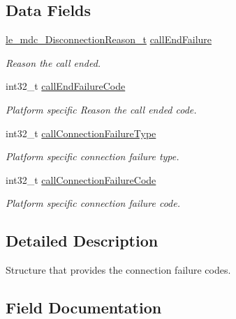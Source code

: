 \subsection*{Data Fields}
\begin{DoxyCompactItemize}
\item 
\hyperlink{le__mdc__interface_8h_ad1fe8909ae01a2f7e33fdbdc6938bf17}{le\+\_\+mdc\+\_\+\+Disconnection\+Reason\+\_\+t} \hyperlink{structpa__mdc___connection_failure_code__t_aa164be5787276d26a94f031c43b2ccf6}{call\+End\+Failure}
\begin{DoxyCompactList}\small\item\em Reason the call ended. \end{DoxyCompactList}\item 
int32\+\_\+t \hyperlink{structpa__mdc___connection_failure_code__t_a751d08e6d71ad00e7b5704e7cfad3309}{call\+End\+Failure\+Code}
\begin{DoxyCompactList}\small\item\em Platform specific Reason the call ended code. \end{DoxyCompactList}\item 
int32\+\_\+t \hyperlink{structpa__mdc___connection_failure_code__t_a9212bcc5698b48e5c10b1964103ee651}{call\+Connection\+Failure\+Type}
\begin{DoxyCompactList}\small\item\em Platform specific connection failure type. \end{DoxyCompactList}\item 
int32\+\_\+t \hyperlink{structpa__mdc___connection_failure_code__t_a26feea2c0f3e60648a6f79c2b5f6c83d}{call\+Connection\+Failure\+Code}
\begin{DoxyCompactList}\small\item\em Platform specific connection failure code. \end{DoxyCompactList}\end{DoxyCompactItemize}


\subsection{Detailed Description}
Structure that provides the connection failure codes. 

\subsection{Field Documentation}
